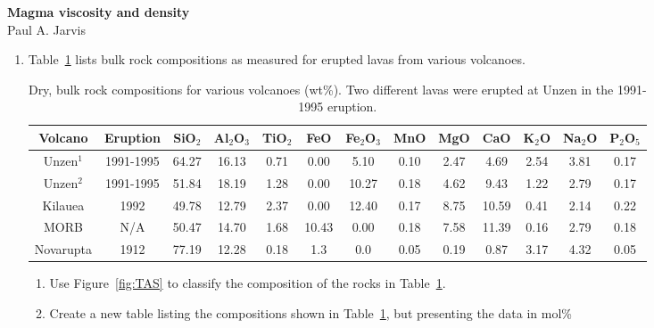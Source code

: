 \documentclass[]{book}
\theoremstyle{definition}
\begin{document}
\begin{center}
{\textbf{Magma viscosity and density}}\\
Paul A. Jarvis\\ %
\end{center}

\vspace{0.2 cm}


\begin{enumerate}
\item Table~\ref{tab:comp} lists bulk rock compositions as measured for erupted lavas from various volcanoes. 

  \begin{table}
    \centering
    \caption{Dry, bulk rock compositions for various volcanoes (wt\%). Two different lavas were erupted at Unzen in the 1991-1995 eruption. \label{tab:comp}}
    \begin{tabular}{|c|c|c c c c c c c c c c c|}
      \hline
      Volcano & Eruption & SiO$_{2}$ & Al$_{2}$O$_{3}$ & TiO$_{2}$ & FeO & Fe$_{2}$O$_{3}$ & MnO & MgO & CaO & K$_{2}$O & Na$_{2}$O & P$_{2}$O$_{5}$ \\
      \hline
      Unzen$^{1}$ & 1991-1995 & 64.27 & 16.13 & 0.71 & 0.00 & 5.10 & 0.10 & 2.47 & 4.69 & 2.54 & 3.81 & 0.17 \\
      Unzen$^{2}$ & 1991-1995 & 51.84 & 18.19 & 1.28 & 0.00 & 10.27 & 0.18 & 4.62 & 9.43 & 1.22 & 2.79 & 0.17 \\
      Kilauea & 1992 & 49.78 & 12.79 & 2.37 & 0.00 & 12.40 & 0.17 & 8.75 & 10.59 & 0.41 & 2.14 & 0.22 \\
      MORB & N/A & 50.47 & 14.70 & 1.68 & 10.43 & 0.00 & 0.18 & 7.58 & 11.39 & 0.16 & 2.79 & 0.18 \\
      Novarupta & 1912 & 77.19 & 12.28 & 0.18 & 1.3 & 0.0 & 0.05 & 0.19 & 0.87 & 3.17 & 4.32 & 0.05 \\
      \hline
    \end{tabular}
  \end{table}

  \begin{enumerate}
  \item Use Figure~\ref{fig:TAS} to classify the composition of the rocks in Table~\ref{tab:comp}. 
  \item Create a new table listing the compositions shown in Table~\ref{tab:comp}, but presenting the data in mol\%
  \end{enumerate}


\end{enumerate}
\end{document}
